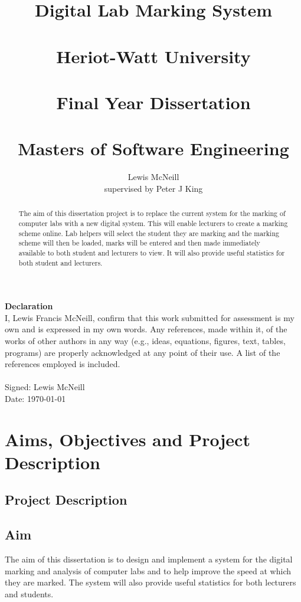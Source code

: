 \documentclass[12pt]{article}  %
\title{Digital Lab Marking System \\~\\  \large{Heriot-Watt University} \\~\\ Final Year Dissertation \\~\\ Masters of Software Engineering}
\author{Lewis McNeill\\
supervised by
Peter J King}
\begin{document}
\maketitle
{}
\newpage

\doublespacing
\textbf{\Large{Declaration}} \\[2em]
I, Lewis Francis McNeill, confirm that this work submitted for assessment is my own and is expressed in my own words. Any references, made within it, of the works of other authors in any way (e.g., ideas, equations, figures, text, tables, programs) are properly acknowledged at any point of their use. A list of the references employed is included.
\\
\\
Signed: Lewis McNeill
\\
Date: \today



\newpage                 
\begin{abstract}

\noindent
The aim of this dissertation project is to replace the current system for the marking of computer labs with a new digital system. This will enable lecturers to create a marking scheme online. Lab helpers will select the student they are marking and the marking scheme will then be loaded, marks will be entered and then made immediately available to both student and lecturers to view. It will also provide useful statistics for both student and lecturers.

\end{abstract}

\newpage                  
\tableofcontents


\newpage     
\section{Aims, Objectives and Project Description}
\setcounter{page}{1}

\subsection{Project Description}



\subsection{Aim}
The aim of this dissertation is to design and implement a system for the digital marking and analysis of computer labs and to help improve the speed at which they are marked. The system will also provide useful statistics for both lecturers and students.
\end{document}
